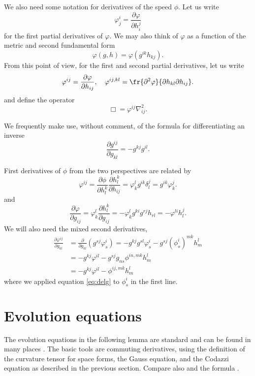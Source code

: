 \documentclass{amsart}
\theoremstyle{definition}
\theoremstyle{remark}
\numberwithin{equation}{section}
\begin{document}
We also need some notation for derivatives of the speed \(\phi\). Let us write
\[
\varphi^{i}_{j} = \frac{\partial \varphi}{\partial h^{j}_{i}}
\]
for the first partial derivatives of \(\varphi\). We may also think of \(\varphi\) as a function of the metric and second fundamental form
\[
\varphi(g, h) = \varphi(g^{ik} h_{kj}).
\]
From this point of view, for the first and second partial derivatives, let us write
\[
\varphi^{ij} = \frac{\partial\varphi}{\partial h_{ij}}, \quad \varphi^{ij,kl} = \fr{\partial^2\varphi}{\partial h_{kl} \partial h_{ij}}.
\]
and define the operator
\[
\Box = \varphi^{ij} \nabla^2_{ij}.
\]

We frequently make use, without comment, of the formula for differentiating an inverse
\[
\frac{\partial g^{ij}}{\partial g_{kl}} = - g^{kj} g^{il}.
\]

First derivatives of \(\phi\) from the two perspectives are related by
\begin{equation}
\label{eq:delh}
\varphi^{ij} = \frac{\partial \phi}{\partial h_l^k} \frac{\partial h_l^k}{\partial h_{ij}} = \varphi^l_k g^{ik} \delta^j_l = g^{ik} \varphi^j_k.
\end{equation}
and
\begin{equation}
\label{eq:delg}
\frac{\partial\varphi}{\partial g_{ij}} = \varphi^{l}_{k} \frac{\partial h^{k}_{l}}{\partial g_{ij}} = -\varphi^{l}_{k} g^{ki} g^{rj} h_{rl} = -\varphi^{li}h^{j}_{l}.
\end{equation}
We will also need the mixed second derivatives,
\begin{equation}
\label{eq:delhdelg}
\begin{split}
\frac{\partial \varphi^{ij}}{\partial g_{kl}} &= \frac{\partial}{\partial g_{kl}} \left(g^{sj} \varphi^{i}_{s} \right) = - g^{kj}g^{sl} \varphi^{i}_{s} - g^{sj} (\phi^i_s)^{mk} h^l_m \\
&= - g^{kj} \varphi^{il} - g^{sj} g_{ns} \phi^{in,mk} h^l_m \\
&= - g^{kj} \varphi^{il} - \phi^{ij,mk} h^l_m
\end{split}
\end{equation}
where we applied equation \eqref{eq:delg} to \(\phi^i_s\) in the first line.

\section{Evolution equations}

The evolution equations in the following lemma are standard and can be found in many places \cite{MR1316556, MR1100812, MR1296393, MR1480081}. The basic tools are commuting derivatives, using the definition of the curvature tensor for space forms, the Gauss equation, and the Codazzi equation as described in the previous section. Compare also \cite[p.~94-95]{Gerhardt:/2006} and the formula \cite[eq.~(6.17)]{Gerhardt:01/1996}.
\end{document}

